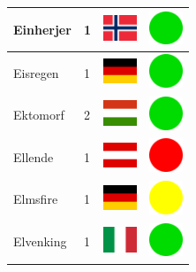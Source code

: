 \documentclass[12pt, a4paper, twoside]{report}
\begin{document}
\begin{center}
\begin{longtable}{|p{5cm}|p{2cm}|p{2cm}|p{2cm}|}
			Einherjer & 1 & \includegraphics[width=1cm]{4x3/no} & \includegraphics[width=1cm]{likes/y} \\ \hline
			Eisregen & 1 & \includegraphics[width=1cm]{4x3/de} & \includegraphics[width=1cm]{likes/y} \\ \hline
			Ektomorf & 2 & \includegraphics[width=1cm]{4x3/hu} & \includegraphics[width=1cm]{likes/y} \\ \hline
			Ellende & 1 & \includegraphics[width=1cm]{4x3/at} & \includegraphics[width=1cm]{likes/n} \\ \hline
			Elmsfire & 1 & \includegraphics[width=1cm]{4x3/de} & \includegraphics[width=1cm]{likes/m} \\ \hline
			Elvenking & 1 & \includegraphics[width=1cm]{4x3/it} & \includegraphics[width=1cm]{likes/y} \\ \hline

\end{longtable}
\end{center}
\end{document}
